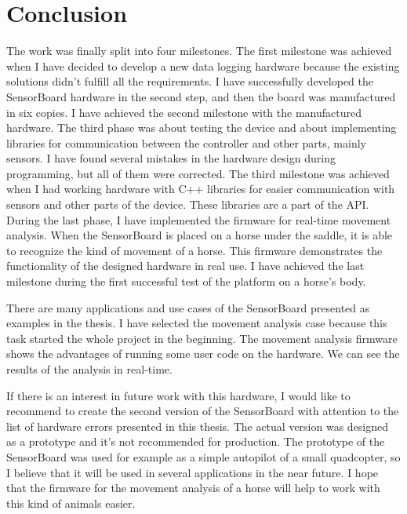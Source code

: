\chapter{Conclusion}
The work was finally split into four milestones. The first milestone was achieved when I have decided to develop a new data logging hardware because the existing solutions didn't fulfill all the requirements. I have successfully developed the SensorBoard hardware in the second step, and then the board was manufactured in six copies. I have achieved the second milestone with the manufactured hardware. The third phase was about testing the device and about implementing libraries for communication between the controller and other parts, mainly sensors. I have found several mistakes in the hardware design during programming, but all of them were corrected. The third milestone was achieved when I had working hardware with C++ libraries for easier communication with sensors and other parts of the device. These libraries are a part of the API. During the last phase, I have implemented the firmware for real-time movement analysis. When the SensorBoard is placed on a horse under the saddle, it is able to recognize the kind of movement of a horse. This firmware demonstrates the functionality of the designed hardware in real use. I have achieved the last milestone during the first successful test of the platform on a horse's body.

There are many applications and use cases of the SensorBoard presented as examples in the thesis. I have selected the movement analysis case because this task started the whole project in the beginning. The movement analysis firmware shows the advantages of running some user code on the hardware. We can see the results of the analysis in real-time.

If there is an interest in future work with this hardware, I would like to recommend to create the second version of the SensorBoard with attention to the list of hardware errors presented in this thesis. The actual version was designed as a prototype and it's not recommended for production. The prototype of the SensorBoard was used for example as a simple autopilot of a small quadcopter, so I believe that it will be used in several applications in the near future. I hope that the firmware for the movement analysis of a horse will help to work with this kind of animals easier.

